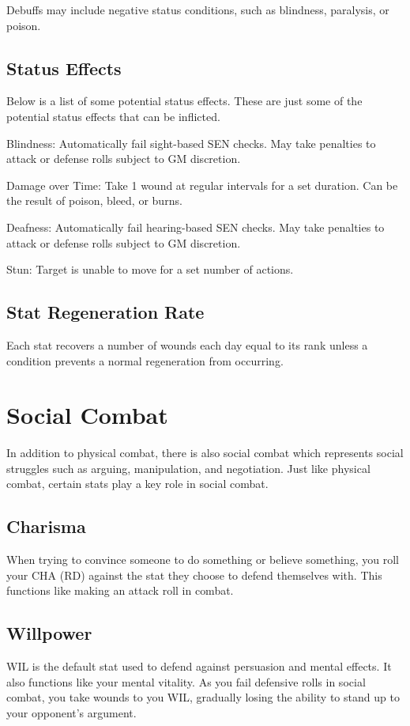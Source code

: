 \begin{multicols}{2}
Debuffs may include negative status conditions, such as blindness, paralysis, or poison.

\subsection{Status Effects}
Below is a list of some potential status effects. These are just some of the potential status effects that can be inflicted.
\begin{wldescription}
\item [Blindness:] Automatically fail sight-based SEN checks. May take penalties to attack or defense rolls subject to GM discretion.
\item [Damage over Time:]  Take 1 wound at regular intervals for a set duration. Can be the result of poison, bleed, or burns.
\item [Deafness:]  Automatically fail hearing-based SEN checks. May take penalties to attack or defense rolls subject to GM discretion.
\item [Stun:] Target is unable to move for a set number of actions.
\end{wldescription}

\subsection{Stat Regeneration Rate}
Each stat recovers a number of wounds each day equal to its rank unless a condition prevents a normal regeneration from occurring.

\section{Social Combat}

In addition to physical combat, there is also social combat which represents social struggles such as arguing, manipulation, and negotiation. Just like physical combat, certain stats play a key role in social combat.

\subsection{Charisma}
When trying to convince someone to do something or believe something, you roll your CHA (RD) against the stat they choose to defend themselves with. This functions like making an attack roll in combat.

\subsection{Willpower}
WIL is the default stat used to defend against persuasion and mental effects. It also functions like your mental vitality. As you fail defensive rolls in social combat, you take wounds to you WIL, gradually losing the ability to stand up to your opponent's argument.


\end{multicols}
